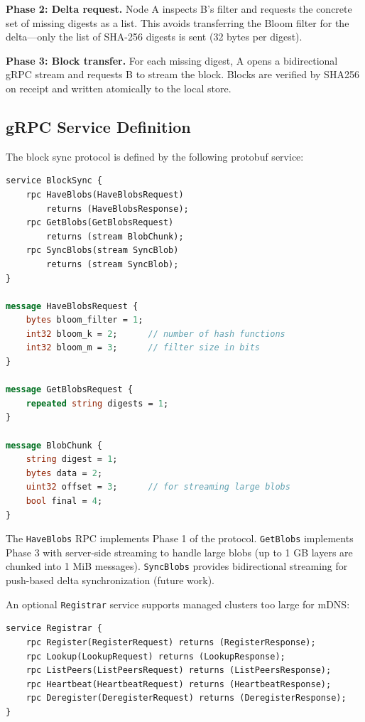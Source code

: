 \documentclass[11pt,a4paper]{article}
\begin{document}
\textbf{Phase 2: Delta request.} Node A inspects B's filter and requests the concrete set of missing digests as a list. This avoids transferring the Bloom filter for the delta---only the list of SHA-256 digests is sent (32 bytes per digest).

\textbf{Phase 3: Block transfer.} For each missing digest, A opens a bidirectional gRPC stream and requests B to stream the block. Blocks are verified by SHA256 on receipt and written atomically to the local store.

\subsection{gRPC Service Definition}

The block sync protocol is defined by the following protobuf service:

\begin{lstlisting}[language=Protobuf]
service BlockSync {
    rpc HaveBlobs(HaveBlobsRequest) 
        returns (HaveBlobsResponse);
    rpc GetBlobs(GetBlobsRequest) 
        returns (stream BlobChunk);
    rpc SyncBlobs(stream SyncBlob) 
        returns (stream SyncBlob);
}

message HaveBlobsRequest {
    bytes bloom_filter = 1;
    int32 bloom_k = 2;      // number of hash functions
    int32 bloom_m = 3;      // filter size in bits
}

message GetBlobsRequest {
    repeated string digests = 1;
}

message BlobChunk {
    string digest = 1;
    bytes data = 2;
    uint32 offset = 3;      // for streaming large blobs
    bool final = 4;
}
\end{lstlisting}

The \texttt{HaveBlobs} RPC implements Phase 1 of the protocol. \texttt{GetBlobs} implements Phase 3 with server-side streaming to handle large blobs (up to 1 GB layers are chunked into 1 MiB messages). \texttt{SyncBlobs} provides bidirectional streaming for push-based delta synchronization (future work).

An optional \texttt{Registrar} service supports managed clusters too large for mDNS:

\begin{lstlisting}[language=Protobuf]
service Registrar {
    rpc Register(RegisterRequest) returns (RegisterResponse);
    rpc Lookup(LookupRequest) returns (LookupResponse);
    rpc ListPeers(ListPeersRequest) returns (ListPeersResponse);
    rpc Heartbeat(HeartbeatRequest) returns (HeartbeatResponse);
    rpc Deregister(DeregisterRequest) returns (DeregisterResponse);
}
\end{lstlisting}
\end{document}
